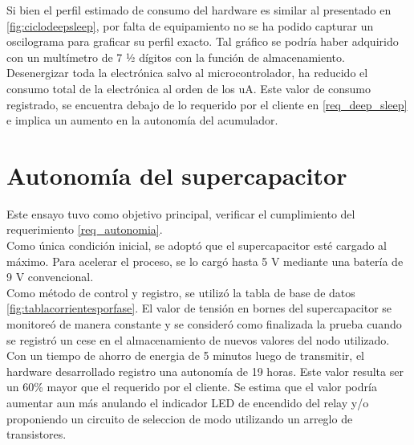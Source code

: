 Si bien el perfil estimado de consumo del hardware es similar al presentado en \ref{fig:ciclodeepsleep}, por falta de equipamiento no se ha podido capturar un oscilograma para graficar su perfil exacto. Tal gráfico se podría haber adquirido con un multímetro de 7 ½ dígitos con la función de almacenamiento.\\
Desenergizar toda la electrónica salvo al microcontrolador, ha reducido el consumo total de la electrónica al orden de los uA. Este valor de consumo registrado, se encuentra debajo de lo requerido por el cliente en \ref{req_deep_sleep} e implica un aumento en la autonomía del acumulador.\\


\section{Autonom\'{i}a del supercapacitor}\label{ensayo_autonomia}
Este ensayo tuvo como objetivo principal, verificar el cumplimiento del requerimiento \ref{req_autonomia}.\\
Como única condición inicial, se adoptó que el supercapacitor esté cargado al máximo. Para acelerar el proceso, se lo cargó hasta 5 V mediante una batería de 9 V convencional.\\
Como método de control y registro, se utilizó la tabla de base de datos \ref{fig:tablacorrientesporfase}. El valor de tensión en bornes del supercapacitor se monitoreó de manera constante y se consideró como finalizada la prueba cuando se registró un cese en el almacenamiento de nuevos valores del nodo utilizado.\\
Con un tiempo de ahorro de energia de 5 minutos luego de transmitir, el hardware desarrollado registro una autonomía de 19 horas. Este valor resulta ser un 60\% mayor que el requerido por el cliente. Se estima que el valor podría aumentar aun más anulando el indicador LED de encendido del relay y/o proponiendo un circuito de seleccion de modo utilizando un arreglo de transistores.\\

